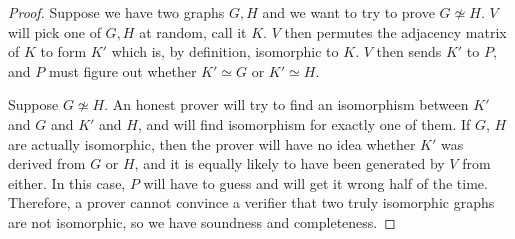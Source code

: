 \begin{proof}
	
	Suppose we have two graphs $G,H$ and we want to try to prove $G\not\simeq H$.  $V$ will pick one of $G,H$ at random, call it $K$.  $V$ then permutes the adjacency matrix of $K$ to form $K'$ which is, by definition, isomorphic to $K$.  $V$ then sends $K'$ to $P$, and $P$ must figure out whether $K'\simeq G$ or $K'\simeq H$.  
	
	
	Suppose $G\not\simeq H$.  An honest prover will try to find an isomorphism between $K'$ and $G$ and $K'$ and $H$, and will find isomorphism for exactly one of them.  If $G$, $H$ are actually isomorphic, then the prover will have no idea whether $K'$ was derived from $G$ or $H$, and it is equally likely to have been generated by $V$ from either.  In this case, $P$ will have to guess and will get it wrong half of the time.  Therefore, a prover cannot convince a verifier that two truly isomorphic graphs are not isomorphic, so we have soundness and completeness.
	
	\end{proof}







